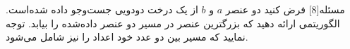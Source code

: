 
‌مسئله[8]
فرض کنید دو عنصر
$a$
و
$b$
از یک درخت دودویی جست‌وجو داده شده‌است.
الگوریتمی ارائه دهید که بزرگترین عنصر در مسیر دو عنصر داده‌شده را بیابد. توجه نمایید که مسیر بین دو عدد خود اعداد را نیز شامل می‌شود.














